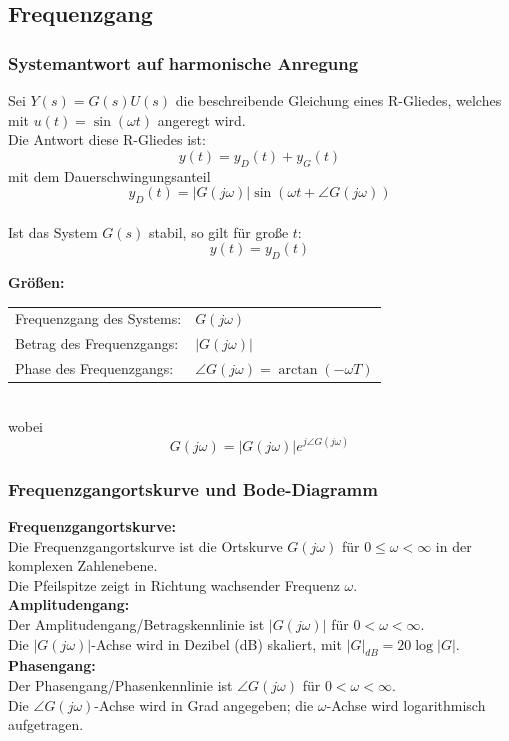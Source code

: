 \documentclass[10pt,a4paper]{article}
\begin{document}
\subsection{Frequenzgang}
\subsubsection{Systemantwort auf harmonische Anregung}
Sei $Y(s) = G(s)U(s)$ die beschreibende Gleichung eines R-Gliedes, welches mit $u(t) = \sin(\omega t)$ angeregt wird. \\
Die Antwort diese R-Gliedes ist:
$$
	y(t) = y_D(t) + y_G(t)
$$
mit dem Dauerschwingungsanteil
$$
	y_D(t) = |G(j\omega)| \sin(\omega t + \angle G(j \omega))
$$ \\

Ist das System $G(s)$ stabil, so gilt für große $t$:
$$
	y(t) = y_D(t)
$$

\textbf{Größen:} \\
\begin{tabular}{ll}
	Frequenzgang des Systems: & $G(j \omega)$ \\
	Betrag des Frequenzgangs: & $|G(j \omega)|$ \\
	Phase des Frequenzgangs: & $\angle G(j \omega) = \arctan(-\omega T)$
\end{tabular} \\

wobei
$$
	G(j \omega) = |G(j \omega)| e^{j \angle G(j \omega)}
$$

\subsubsection{Frequenzgangortskurve und Bode-Diagramm}
\textbf{Frequenzgangortskurve:} \\
Die Frequenzgangortskurve ist die Ortskurve $G(j \omega)$ für $0 ≤ \omega < ∞$ in der komplexen Zahlenebene. \\
Die Pfeilspitze zeigt in Richtung wachsender Frequenz $\omega$. \\

\textbf{Amplitudengang:} \\
Der Amplitudengang/Betragskennlinie ist $|G(j \omega)|$ für $0 < \omega < ∞$. \\
Die $|G(j \omega)|$-Achse wird in Dezibel (dB) skaliert, mit $|G|_{dB} = 20\log|G|$. \\

\textbf{Phasengang:} \\
Der Phasengang/Phasenkennlinie ist $\angle G(j \omega)$ für $0 < \omega < ∞$. \\
Die $\angle G(j \omega)$-Achse wird in Grad angegeben; die $\omega$-Achse wird logarithmisch aufgetragen. \\
\end{document}
